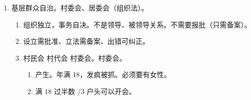 \begin{enumerate}
\begin{enumerate}
          \item 立法机关。立法会、立法权。
                \begin{enumerate}
                  \item 特首签署，公布生效 \yjt 报人常备案 \yjt 只能发回（变相撤销） \yjt 立即失效，没有溯及力。
                  \item 立法会议员。都要政审，不允许申诉。香港立法会，八成自己人。
                  \item 财政权。预算行政长官签署，报国务院备案。
                  \item 监督权。听取施政报告、质询政府工作、辩论公共利益、弹劾行政长官。报国务院决定。
                \end{enumerate}
          \item 司法机关。选项考点。\yi 香港没有检察院。\er 独委会推荐，行政长官任命。报全人常。
          \item 法律制度。一条红线，两种打法。
                \begin{enumerate}
                  \item 基本法。小宪法。
                  \item 保留法。
                  \item 附件三。涉外难以管辖，港府无效执法、现实威胁重大。。
                  \item 律政司才能提起公诉。
                \end{enumerate}
          \item 总结。和“法”有关的找全人常，其他找国务院。
          \item 立法立法会、特首来签署，全人常备案；预算行来签、国务院备案；监督要找国。
          \item 没有检察院，独委会推荐，长官来任命，报告全人常。
        \end{enumerate}
  \item 基层群众自治。村委会、居委会（组织法）。
        \begin{enumerate}
          \item 组织独立，事务自决。不是领导、被领导关系。不需要报批（只需备案）。
          \item 设立需批准、立法需备案、出错可纠正。
          \item 村民会 \ydy 村代会 \dy 村委会。村委会。
                \begin{enumerate}
                  \item 产生。年满 18，发疯被抓。必须要有女性。
                  \item 满 18 过半数 /3 户头可以开会。

\end{enumerate}
\end{enumerate}
\end{enumerate}

